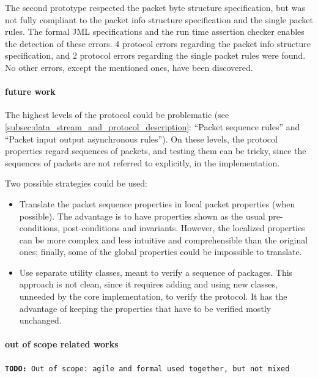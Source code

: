 \documentclass[english]{lni}
\newcommand{\todo}[1]{\texttt{\textbf{TODO:} #1}}
\begin{document}
The second prototype respected the packet byte structure specification, but was not fully compliant to the packet info structure specification and the single packet rules.
The formal JML specifications and the run time assertion checker enables the detection of these errors.
4 protocol errors regarding the packet info structure specification, and 2 protocol errors regarding the single packet rules were found. 
No other errors, except the mentioned ones, have been discovered.

\paragraph*{future work}

The highest levels of the protocol could be problematic (see \ref{subsec:data_stream_and_protocol_description}: ``Packet sequence rules'' and ``Packet input output asynchronous rules''). 
On these levels, the protocol properties regard sequences of packets, and testing them can be tricky, since the sequences of packets are not referred to explicitly, in the implementation.  

Two possible strategies could be used:
\begin{itemize}
\item Translate the packet sequence properties in local packet properties (when possible).  
The advantage is to have properties shown as the usual pre-conditions, post-conditions and invariants.  
However, the localized properties can be more complex and less intuitive and comprehensible than the original ones; finally, some of the global properties could be impossible to translate.
\item Use separate utility classes, meant to verify a sequence of packages.  
This approach is not clean, since it requires adding and using new classes, unneeded by the core implementation, to verify the protocol.  It has the advantage of keeping the properties that have to be verified mostly unchanged.
\end{itemize}

\paragraph*{out of scope related works}

\todo{Out of scope: agile and formal used together, but not mixed}
\end{document}

